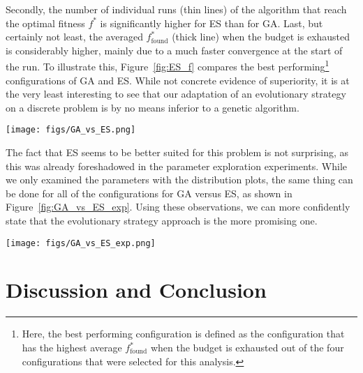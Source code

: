 \documentclass{article}
\begin{document}
Secondly, the number of individual runs (thin lines) of the algorithm that reach the optimal fitness $f^*$ is significantly higher for ES than for GA.
Last, but certainly not least, the averaged $f^*_{\mathrm{found}}$ (thick line) when the budget is exhausted is considerably higher, mainly due to a much faster convergence at the start of the run.
To illustrate this, Figure~\ref{fig:ES_f} compares the best performing\footnote{
    Here, the best performing configuration is defined as the configuration that has the highest average $f^*_{\mathrm{found}}$ when the budget is exhausted out of the four configurations that were selected for this analysis.
} configurations of GA and ES.
While not concrete evidence of superiority, it is at the very least interesting to see that our adaptation of an evolutionary strategy on a discrete problem is by no means inferior to a genetic algorithm.

\begin{figure*}[htbp]
    \centering
    \texttt{[image: figs/GA\_vs\_ES.png]}
    \captionsetup{width=.75\textwidth}
    \caption{
        Comparison of the best performing (out of four empirically selected) configurations of GA versus ES.
    }
    \label{fig:GA_vs_ES}
\end{figure*}

The fact that ES seems to be better suited for this problem is not surprising, as this was already foreshadowed in the parameter exploration experiments.
While we only examined the parameters with the distribution plots, the same thing can be done for all of the configurations for GA versus ES, as shown in Figure~\ref{fig:GA_vs_ES_exp}.
Using these observations, we can more confidently state that the evolutionary strategy approach is the more promising one.

\begin{figure*}[htbp]
    \centering
    \texttt{[image: figs/GA\_vs\_ES\_exp.png]}
    \captionsetup{width=.75\textwidth}
    \caption{
        Comparison of all configurations of GA versus ES, shown as a distribution of the $f^*_{\mathrm{avg}}$ when the budget is exhausted.
    }
    \label{fig:GA_vs_ES_exp}
\end{figure*}

\newpage

\section{Discussion and Conclusion}
\label{sec:disres}
\end{document}
